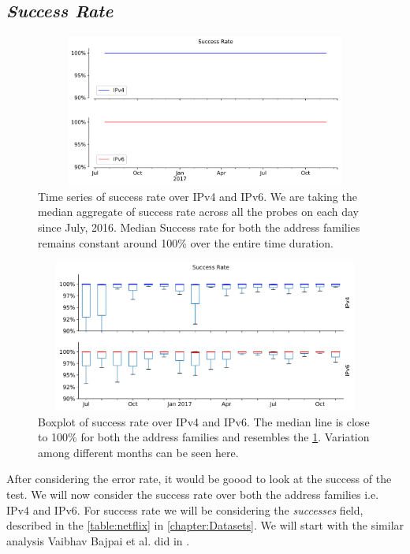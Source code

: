 \subsection*{\textit{Success Rate}}
\begin{figure}[!ht]
	\centering
	\includegraphics[keepaspectratio, height=5cm, width=15cm]{figures/success/netflix-success-rate-timeseries.pdf}
	\caption[Success Rate Timeseries]{Time series of success rate over IPv4 and IPv6. We are taking the median aggregate of success rate across all the probes on each day since July, 2016. Median Success rate for both the address families remains constant around 100\% over the entire time duration.}
	\label{fig:Success Rate Timeseries}
\end{figure}
\begin{figure}[!ht]
	\centering
	\includegraphics[keepaspectratio, height=5cm, width=15cm]{figures/success/netflix-success-rate-boxplot.pdf}
	\caption[Success Rate Boxplot per Month]{Boxplot of success rate over IPv4 and IPv6. The median line is close to 100\% for both the address families and resembles the \cref{fig:Success Rate Timeseries}. Variation among different months can be seen here.}
	\label{fig:Success Rate Boxplot}
\end{figure}
After considering the error rate, it would be goood to look at the success of the test. We will now consider the success rate over both the address families i.e. IPv4 and IPv6.
For success rate we will be considering the \textit{successes} field, described in the \cref{table:netflix} in \cref{chapter:Datasets}. We will start with the similar analysis Vaibhav Bajpai et al. did in \cite{bajpaimeasuring}.
